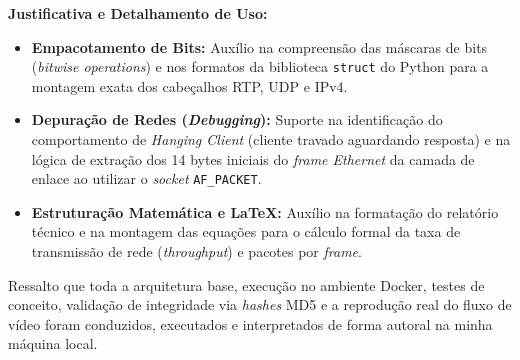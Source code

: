 \documentclass[12pt]{article}
\begin{document}
\textbf{Justificativa e Detalhamento de Uso:}
\begin{itemize}
    \item \textbf{Empacotamento de Bits:} Auxílio na compreensão das máscaras de bits (\textit{bitwise operations}) e nos formatos da biblioteca \texttt{struct} do Python para a montagem exata dos cabeçalhos RTP, UDP e IPv4.
    \item \textbf{Depuração de Redes (\textit{Debugging}):} Suporte na identificação do comportamento de \textit{Hanging Client} (cliente travado aguardando resposta) e na lógica de extração dos 14 bytes iniciais do \textit{frame Ethernet} da camada de enlace ao utilizar o \textit{socket} \texttt{AF\_PACKET}.
    \item \textbf{Estruturação Matemática e \LaTeX:} Auxílio na formatação do relatório técnico e na montagem das equações para o cálculo formal da taxa de transmissão de rede (\textit{throughput}) e pacotes por \textit{frame}.
\end{itemize}

Ressalto que toda a arquitetura base, execução no ambiente Docker, testes de conceito, validação de integridade via \textit{hashes} MD5 e a reprodução real do fluxo de vídeo foram conduzidos, executados e interpretados de forma autoral na minha máquina local.
\end{document}
